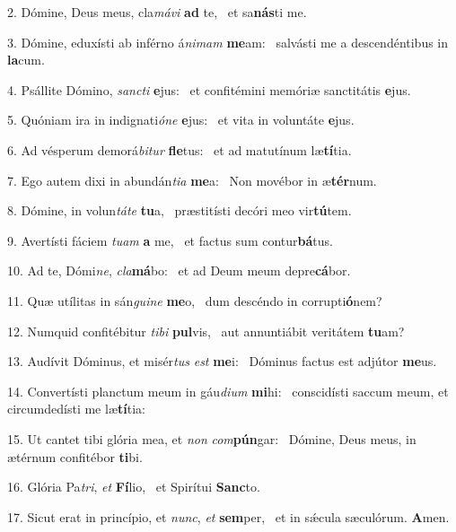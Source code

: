 2. Dómine, Deus meus, cla\textit{má}\textit{vi} \textbf{ad} te, \ast\  et sa\textbf{nás}ti me.\

3. Dómine, eduxísti ab inférno á\textit{ni}\textit{mam} \textbf{me}am: \ast\  salvásti me a descendéntibus in \textbf{la}cum.\

4. Psállite Dómino, \textit{sanc}\textit{ti} \textbf{e}jus: \ast\  et confitémini memóriæ sanctitátis \textbf{e}jus.\

5. Quóniam ira in indignati\textit{ó}\textit{ne} \textbf{e}jus: \ast\  et vita in voluntáte \textbf{e}jus.\

6. Ad vésperum demorá\textit{bi}\textit{tur} \textbf{fle}tus: \ast\  et ad matutínum læ\textbf{tí}tia.\

7. Ego autem dixi in abundán\textit{ti}\textit{a} \textbf{me}a: \ast\  Non movébor in æ\textbf{tér}num.\

8. Dómine, in volun\textit{tá}\textit{te} \textbf{tu}a, \ast\  præstitísti decóri meo vir\textbf{tú}tem.\

9. Avertísti fáciem \textit{tu}\textit{am} \textbf{a} me, \ast\  et factus sum contur\textbf{bá}tus.\

10. Ad te, Dómi\textit{ne}, \textit{cla}\textbf{má}bo: \ast\  et ad Deum meum depre\textbf{cá}bor.\

11. Quæ utílitas in sán\textit{gui}\textit{ne} \textbf{me}o, \ast\  dum descéndo in corrupti\textbf{ó}nem?\

12. Numquid confitébitur \textit{ti}\textit{bi} \textbf{pul}vis, \ast\  aut annuntiábit veritátem \textbf{tu}am?\

13. Audívit Dóminus, et misér\textit{tus} \textit{est} \textbf{me}i: \ast\  Dóminus factus est adjútor \textbf{me}us.\

14. Convertísti planctum meum in gáu\textit{di}\textit{um} \textbf{mi}hi: \ast\  conscidísti saccum meum, et circumdedísti me læ\textbf{tí}tia:\

15. Ut cantet tibi glória mea, et \textit{non} \textit{com}\textbf{pún}gar: \ast\  Dómine, Deus meus, in ætérnum confitébor \textbf{ti}bi.\

16. Glória Pa\textit{tri}, \textit{et} \textbf{Fí}lio, \ast\  et Spirítui \textbf{Sanc}to.\

17. Sicut erat in princípio, et \textit{nunc}, \textit{et} \textbf{sem}per, \ast\  et in sǽcula sæculórum. \textbf{A}men.\

